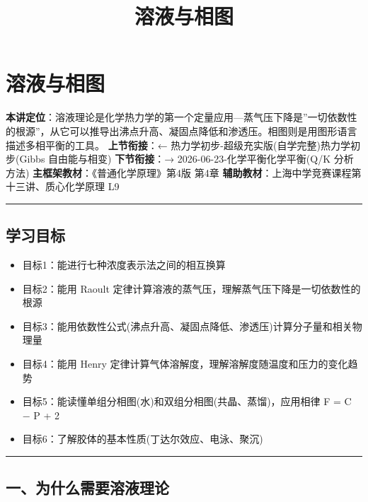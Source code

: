 \documentclass[a4paper,11pt]{ctexart}
\title{溶液与相图}
\date{}
\providecommand{\tightlist}{\setlength{\itemsep}{0pt}\setlength{\parskip}{0pt}}
\begin{document}
\maketitle
\tableofcontents
\newpage
\section{溶液与相图}\label{ux6eb6ux6db2ux4e0eux76f8ux56fe}

\textbf{本讲定位}：溶液理论是化学热力学的第一个定量应用---蒸气压下降是''一切依数性的根源''，从它可以推导出沸点升高、凝固点降低和渗透压。相图则是用图形语言描述多相平衡的工具。
\textbf{上节衔接}：← 热力学初步-超级充实版(自学完整)\textbar 热力学初步(Gibbs 自由能与相变)
\textbf{下节衔接}：→ 2026-06-23-化学平衡\textbar 化学平衡(Q/K 分析方法)
\textbf{主框架教材}：《普通化学原理》第4版 第4章
\textbf{辅助教材}：上海中学竞赛课程第十三讲、质心化学原理 L9

\begin{center}\rule{0.5\linewidth}{0.5pt}\end{center}

\subsection{学习目标}\label{ux5b66ux4e60ux76eeux6807}

\begin{itemize}
\tightlist
\item
  目标1：能进行七种浓度表示法之间的相互换算
\item
  目标2：能用 Raoult 定律计算溶液的蒸气压，理解蒸气压下降是一切依数性的根源
\item
  目标3：能用依数性公式(沸点升高、凝固点降低、渗透压)计算分子量和相关物理量
\item
  目标4：能用 Henry 定律计算气体溶解度，理解溶解度随温度和压力的变化趋势
\item
  目标5：能读懂单组分相图(水)和双组分相图(共晶、蒸馏)，应用相律 F = C − P + 2
\item
  目标6：了解胶体的基本性质(丁达尔效应、电泳、聚沉)
\end{itemize}

\begin{center}\rule{0.5\linewidth}{0.5pt}\end{center}

\subsection{一、为什么需要溶液理论}\label{ux4e00ux4e3aux4ec0ux4e48ux9700ux8981ux6eb6ux6db2ux7406ux8bba}
\end{document}
